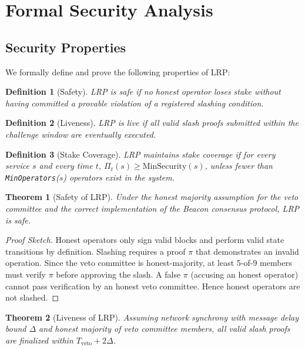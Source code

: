 \documentclass[11pt]{article}
\newtheorem{theorem}{Theorem}
\newtheorem{definition}{Definition}
\begin{document}
\section{Formal Security Analysis}
\label{sec:security}

\subsection{Security Properties}

We formally define and prove the following properties of LRP:

\begin{definition}[Safety]
LRP is \emph{safe} if no honest operator loses stake without having committed a
provable violation of a registered slashing condition.
\end{definition}

\begin{definition}[Liveness]
LRP is \emph{live} if all valid slash proofs submitted within the challenge window are
eventually executed.
\end{definition}

\begin{definition}[Stake Coverage]
LRP maintains \emph{stake coverage} if for every service $s$ and every time $t$,
$\Pi_t(s) \geq \text{MinSecurity}(s)$, unless fewer than \texttt{MinOperators}($s$) operators
exist in the system.
\end{definition}

\begin{theorem}[Safety of LRP]
Under the honest majority assumption for the veto committee and the correct implementation
of the Beacon consensus protocol, LRP is safe.
\end{theorem}

\begin{proof}[Proof Sketch]
Honest operators only sign valid blocks and perform valid state transitions by definition.
Slashing requires a proof $\pi$ that demonstrates an invalid operation. Since the veto
committee is honest-majority, at least 5-of-9 members must verify $\pi$ before approving
the slash. A false $\pi$ (accusing an honest operator) cannot pass verification by an
honest veto committee. Hence honest operators are not slashed.
\end{proof}

\begin{theorem}[Liveness of LRP]
Assuming network synchrony with message delay bound $\Delta$ and honest majority of
veto committee members, all valid slash proofs are finalized within
$T_{\text{veto}} + 2\Delta$.
\end{theorem}
\end{document}
